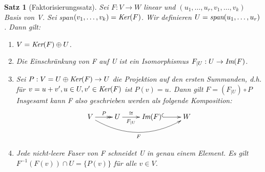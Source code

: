 \documentclass[12pt,a4paper]{article}
\theoremstyle{plain}
\newtheorem{Satz}[Theorem]{Satz}
\numberwithin{equation}{section}
\begin{document}
\begin{Satz} [Faktorisierungssatz]
Sei $F:V\rightarrow W$ linear und $(u_1,\ldots,u_r,v_1,\ldots,v_k)$ Basis von V. Sei \emph{span}$(v_1,\ldots,v_k)=\emph{Ker}(F)$. Wir definieren $U=\emph{span}(u_1,\ldots,u_r)$. Dann gilt:
\begin{enumerate}
\renewcommand{\labelenumi}{\emph{(\alph{enumi})}}
\item $V=\emph{Ker}(F)\oplus U$.
\item Die Einschränkung von F auf U ist ein Isomorphismus $F_{|U}:U\rightarrow \emph{Im}(F)$.
\item Sei $P:V=U\oplus\emph{Ker}(F)\rightarrow U$ die Projektion auf den ersten Summanden, d.h. für $v=u+v', u\in U, v'\in \emph{Ker}(F)$ ist $P(v)=u$. Dann gilt $F=(F_{|U})\circ P$
Insgesamt kann F also geschrieben werden als folgende Komposition:
\[ \begin{xy}
	\xymatrix{
		V \ar@{->>}[r]^P \ar@/_ 0.75cm/[rrr]_F & U \ar[r]^/-.5em/{\cong}_/-.5em/{F_{|U}} & \emph{Im}(F) \ar@{^(->}[r] & W
	}
\end{xy} \]
\item Jede nicht-leere Faser von F schneidet U in genau einem Element. Es gilt $F^{-1}(F(v))\cap U=\{P(v)\}$ für alle $v\in V$.
\end{enumerate}
\end{Satz}
\end{document}
